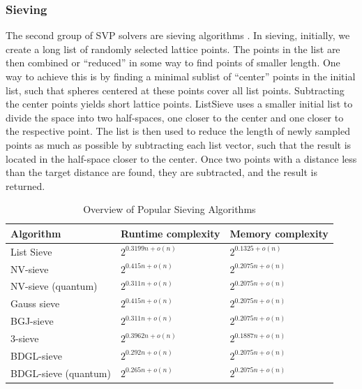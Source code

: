 \subsubsection{Sieving}
The second group of SVP solvers are sieving algorithms \cite{ADHKPS19, MV10, NV08, BGJ15, BLS16, HK17,BDGL16}. In sieving, initially, we create a long list of randomly selected lattice points. The points in the list are then combined or ``reduced'' in some way to find points of smaller length. One way to achieve this is by finding a minimal sublist of ``center'' points in the initial list, such that spheres centered at these points cover all list points. Subtracting the center points yields short lattice points. ListSieve \cite{MV10} uses a smaller initial list to divide the space into two half-spaces, one closer to the center and one closer to the respective point. The list is then used to reduce the length of newly sampled points as much as possible by subtracting each list vector, such that the result is located in the half-space closer to the center. Once two points with a distance less than the target distance are found, they are subtracted, and the result is returned.

\begin{table}[h]
  \centering
  \begin{tabular}{lll}
    \toprule
    Algorithm                                & Runtime complexity   & Memory complexity    \\\hline
    List Sieve \cite{MV10}                   & $2^{0.3199n + o(n)}$ & $2^{0.1325 + o(n)}$  \\
    NV-sieve \cite{NV08, ADHKPS19}           & $2^{0.415n + o(n)}$  & $2^{0.2075n + o(n)}$ \\
    NV-sieve (quantum) \cite{NV08, ADHKPS19} & $2^{0.311n + o(n)}$  & $2^{0.2075n + o(n)}$ \\
    Gauss sieve \cite{MV10, HK17}            & $2^{0.415n + o(n)}$  & $2^{0.2075n + o(n)}$ \\
    BGJ-sieve \cite{BGJ15}                   & $2^{0.311n + o(n)}$  & $2^{0.2075n + o(n)}$ \\
    3-sieve \cite{BLS16, HK17}               & $2^{0.3962n + o(n)}$ & $2^{0.1887n + o(n)}$ \\
    BDGL-sieve \cite{BDGL16}                 & $2^{0.292n + o(n)}$  & $2^{0.2075n + o(n)}$ \\
    BDGL-sieve (quantum) \cite{BDGL16}       & $2^{0.265n + o(n)}$  & $2^{0.2075n + o(n)}$ \\
    \bottomrule
  \end{tabular}
  \caption{Overview of Popular Sieving Algorithms} %
  \label{tab:sieving}
\end{table}

